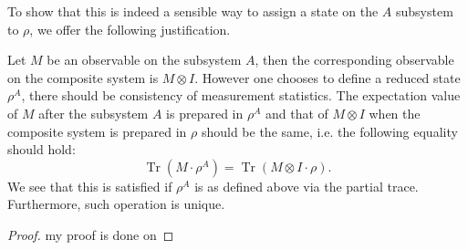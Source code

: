 To show that this is indeed a sensible way to assign a state on the $A$ subsystem to $\rho$, we offer the following justification. 

Let $M$ be an observable on the subsystem $A$, then the corresponding observable on the composite system is $M \otimes I$. However one chooses to define a reduced state $\rho^A$, there should be consistency of measurement statistics. The expectation value of $M$ after the subsystem $A$ is prepared in $\rho^A$ and that of $M \otimes I$ when the composite system is prepared in $\rho$ should be the same, i.e. the following equality should hold:
$$
\operatorname{Tr}\left(M \cdot \rho^A\right)=\operatorname{Tr}(M \otimes I \cdot \rho) .
$$
We see that this is satisfied if $\rho^A$ is as defined above via the partial trace. Furthermore, such operation is unique.

\begin{proof}
    my proof is done on
\end{proof}